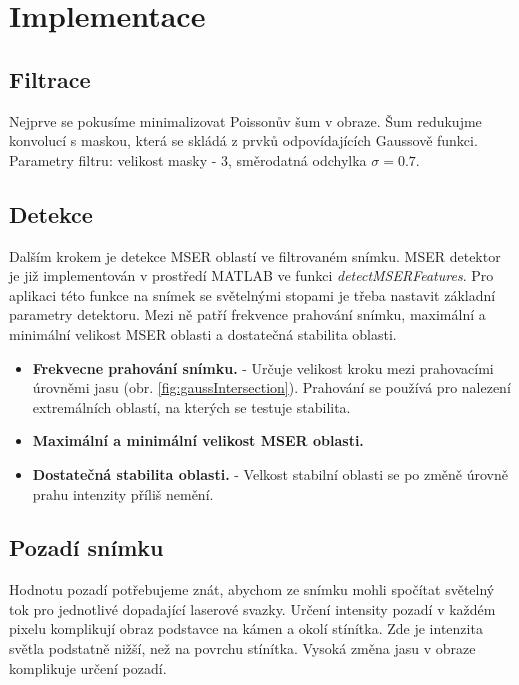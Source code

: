 \section{Implementace}

\subsection{Filtrace}
   Nejprve se pokusíme minimalizovat Poissonův šum v obraze. Šum redukujme konvolucí s maskou, která se skládá z prvků odpovídajících Gaussově funkci. Parametry filtru: velikost masky - \SI{3}{\px}, směrodatná odchylka $\sigma = 0.7$.

\subsection{Detekce} 
   Dalším krokem je detekce MSER oblastí ve filtrovaném snímku. MSER detektor je již implementován v prostředí MATLAB ve funkci \textit{detectMSERFeatures}. Pro aplikaci této funkce na snímek se světelnými stopami je třeba nastavit základní parametry detektoru. Mezi ně patří frekvence prahování snímku, maximální a minimální velikost MSER oblasti a dostatečná stabilita oblasti. 
   
   \begin{itemize}
   \item \textbf{Frekvecne prahování snímku.} - Určuje velikost kroku mezi prahovacími úrovněmi jasu (obr. \ref{fig:gaussIntersection}). Prahování se používá pro nalezení extremálních oblastí, na kterých se testuje stabilita.
   
   \item \textbf{Maximální a minimální velikost MSER oblasti.} 
   
   \item \textbf{Dostatečná stabilita oblasti.} - Velkost stabilní oblasti se po změně úrovně prahu intenzity příliš nemění. 
   \end{itemize}

\subsection{Pozadí snímku}
	Hodnotu pozadí potřebujeme znát, abychom ze snímku mohli spočítat světelný tok pro jednotlivé dopadající laserové svazky. Určení intensity pozadí v každém pixelu komplikují obraz   podstavce na kámen a okolí stínítka. Zde je intenzita světla podstatně nižší, než na povrchu stínítka. Vysoká změna jasu v obraze komplikuje určení pozadí.  
	
